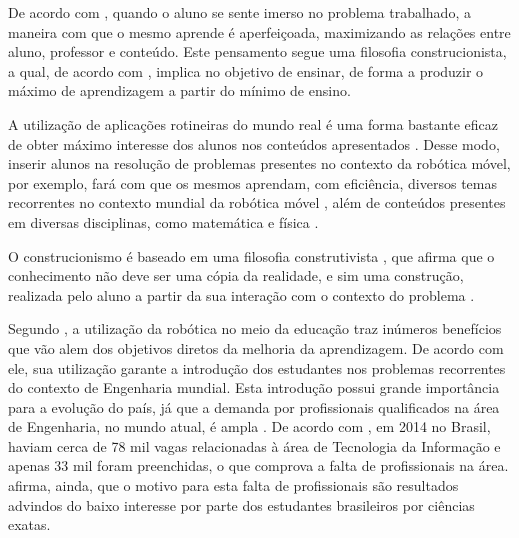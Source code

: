 
	De acordo com \cite{construcionismoPapert}, quando o aluno se sente imerso no problema trabalhado, a maneira com que o mesmo aprende é aperfeiçoada, maximizando as relações entre aluno, professor e conteúdo. Este pensamento segue uma filosofia construcionista, a qual, de acordo com \cite{construcionismoPapert}, implica no objetivo de ensinar, de forma a produzir o máximo de aprendizagem a partir do mínimo de ensino.

	A utilização de aplicações rotineiras do mundo real é uma forma bastante eficaz de obter máximo interesse dos alunos nos conteúdos apresentados \cite{construcionismoPapert}. Desse modo, inserir alunos na resolução de problemas presentes no contexto da robótica móvel, por exemplo, fará com que os mesmos aprendam, com eficiência, diversos temas recorrentes no contexto mundial da robótica móvel \cite{simpleRobotsIntroductionEng}, além de conteúdos presentes em diversas disciplinas, como matemática e física \cite{roboticaEducacionalAulasMatematica}.

	O construcionismo é baseado em uma filosofia construtivista \cite{construcionismoPapert}, que afirma que o conhecimento não deve ser uma cópia da realidade, e sim uma construção, realizada pelo aluno a partir da sua interação com o contexto do problema \cite{oQueEConstrutivismo}.


Segundo \cite{simpleRobotsIntroductionEng}, a utilização da robótica no meio da educação traz inúmeros benefícios que vão alem dos objetivos diretos da melhoria da aprendizagem. De acordo com ele, sua utilização garante a introdução dos estudantes nos problemas recorrentes do contexto de Engenharia mundial. Esta introdução possui grande importância para a evolução do país, já que a demanda por profissionais qualificados na área de Engenharia, no mundo atual, é ampla \cite{simpleRobotsIntroductionEng}. De acordo com \cite{analiseFerramentaEnsinoComputacao}, em 2014 no Brasil, haviam cerca de 78 mil vagas relacionadas à área de Tecnologia da Informação e apenas 33 mil foram preenchidas, o que comprova a falta de profissionais na área.  \cite{analiseFerramentaEnsinoComputacao} afirma, ainda, que o motivo para esta falta de profissionais são resultados advindos do baixo interesse por parte dos estudantes brasileiros por ciências exatas.

